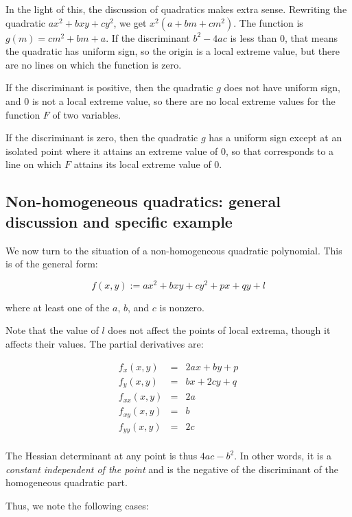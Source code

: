 \documentclass[10pt]{amsart}
\begin{document}
In the light of this, the discussion of quadratics makes extra
sense. Rewriting the quadratic $ax^2 + bxy + cy^2$, we get $x^2(a + bm
+ cm^2)$. The function is $g(m) = cm^2 + bm + a$. If the discriminant
$b^2 - 4ac$ is less than $0$, that means the quadratic has uniform
sign, so the origin is a local extreme value, but there are no lines
on which the function is zero.

If the discriminant is positive, then the quadratic $g$ does not have
uniform sign, and $0$ is not a local extreme value, so there are no
local extreme values for the function $F$ of two variables.

If the discriminant is zero, then the quadratic $g$ has a uniform sign
except at an isolated point where it attains an extreme value of $0$,
so that corresponds to a line on which $F$ attains its local extreme
value of $0$.

\subsection{Non-homogeneous quadratics: general discussion and specific example}

We now turn to the situation of a non-homogeneous quadratic
polynomial. This is of the general form:

$$f(x,y) := ax^2 + bxy + cy^2 + px + qy + l$$

where at least one of the $a$, $b$, and $c$ is nonzero.

Note that the value of $l$ does not affect the points of local
extrema, though it affects their values. The partial derivatives are:

\begin{eqnarray*}
  f_x(x,y) & = & 2ax + by + p \\
  f_y(x,y) & = & bx + 2cy + q \\
  f_{xx}(x,y)&=& 2a\\
  f_{xy}(x,y)&=& b \\
  f_{yy}(x,y)&=&2c\\
\end{eqnarray*}

The Hessian determinant at any point is thus $4ac - b^2$. In other
words, it is a {\em constant independent of the point} and is the
negative of the discriminant of the homogeneous quadratic part.

Thus, we note the following cases:
\end{document}
